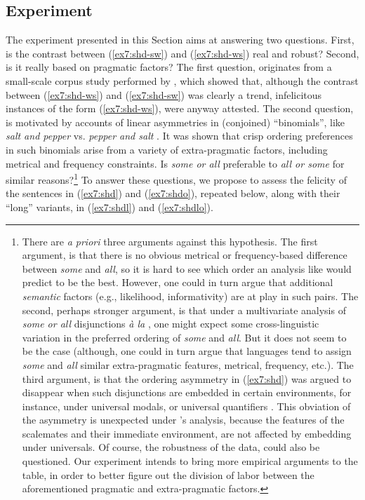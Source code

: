 \subsection{Experiment}
The experiment presented in this Section aims at answering two questions. First, is the contrast between (\ref{ex7:shd-sw}) and (\ref{ex7:shd-ws}) real and robust? Second, is it really based on pragmatic factors? The first question, originates from a small-scale corpus study performed by \citeauthor{Fox2018}, which showed that, although the contrast between (\ref{ex7:shd-ws}) and (\ref{ex7:shd-sw}) was clearly a trend, infelicitous instances of the form (\ref{ex7:shd-ws}), were anyway attested. The second question, is motivated by accounts of linear asymmetries in (conjoined) ``binomials'', like \textit{salt and pepper} vs. \textit{pepper and salt} \citep{Benor2006}. It was shown that crisp ordering preferences in such binomials arise from a variety of extra-pragmatic factors, including metrical and frequency constraints. Is \textit{some or all} preferable to \textit{all or some} for similar reasons?\footnote{There are \textit{a priori} three arguments against this hypothesis. The first argument, is that there is no obvious metrical or frequency-based difference between \textit{some} and \textit{all}, so it is hard to see which order an analysis like \citet{Benor2006} would predict to be the best. However, one could in turn argue that additional \textit{semantic} factors (e.g., likelihood, informativity) are at play in such pairs. The second, perhaps stronger argument, is that under a multivariate analysis of \textit{some or all} disjunctions \textit{à la} \citet{Benor2006}, one might expect some cross-linguistic variation in the preferred ordering of \textit{some} and \textit{all}. But it does not seem to be the case (although, one could in turn argue that languages tend to assign \textit{some} and \textit{all} similar extra-pragmatic features, metrical, frequency, etc.). The third argument, is that the ordering asymmetry in (\ref{ex7:shd}) was argued to disappear when such disjunctions are embedded in certain environments, for instance, under universal modals, or universal quantifiers \citep{Fox2018}. This obviation of the asymmetry is unexpected under \citet{Benor2006}'s analysis, because the features of the scalemates and their immediate environment, are not affected by embedding under universals. Of course, the robustness of the data, could also be questioned. Our experiment intends to bring more empirical arguments to the table, in order to better figure out the division of labor between the aforementioned pragmatic and extra-pragmatic factors.} To answer these questions, we propose to assess the felicity of the sentences in (\ref{ex7:shd}) and (\ref{ex7:shdo}), repeated below, along with their ``long'' variants, in (\ref{ex7:shdl}) and (\ref{ex7:shdlo}).

